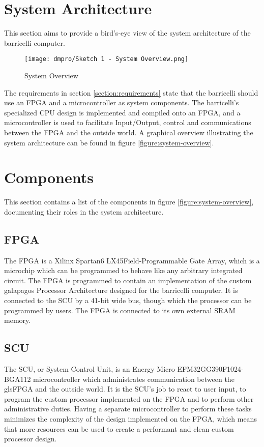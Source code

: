 \section{System Architecture}

This section aims to provide a bird's-eye view of the system architecture of the \Gls{barricelli} computer.

\begin{figure}[H]
\texttt{[image: dmpro/Sketch 1 - System Overview.png]}
\caption{System Overview}
\label{figure:system-overview}
\end{figure}

The requirements in section \vref{section:requirements} state that the \Gls{barricelli} should use an \gls{FPGA} and a microcontroller as system components.
The \Gls{barricelli}'s specialized CPU design is implemented and compiled onto an \gls{FPGA}, and a microcontroller is used to facilitate Input/Output, control and communications between the \gls{FPGA} and the outside world.
A graphical overview illustrating the system architecture can be found in figure \vref{figure:system-overview}.

\section{Components}

This section contains a list of the components in figure \vref{figure:system-overview}, documenting their roles in the system architecture.

\subsection{\gls{FPGA}}

The \gls{FPGA} is a Xilinx Spartan6 LX45\cn Field-Programmable Gate Array, which is a microchip which can be programmed to behave like any arbitrary integrated circuit.
The \gls{FPGA} is programmed to contain an implementation of the custom \Gls{galapagos} Processor Architecture designed for the \Gls{barricelli} computer.
It is connected to the \gls{SCU} by a 41-bit wide bus, though which the processor can be programmed by users.
The \gls{FPGA} is connected to its own external \gls{SRAM} memory.

\subsection{\gls{SCU}}

The \gls{SCU}, or System Control Unit, is an Energy Micro EFM32GG390F1024-BGA112 microcontroller which administrates communication between the gls{FPGA} and the outside world.
It is the \gls{SCU}'s job to react to user input, to program the custom processor implemented on the FPGA and to perform other administrative duties.
Having a separate microcontroller to perform these tasks minimizes the complexity of the design implemented on the \gls{FPGA}, which means that more resources can be used to create a performant and clean custom processor design.

